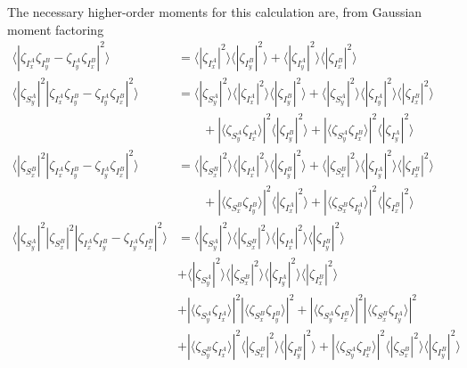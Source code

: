 \documentclass[aps,twocolumn,secnumarabic,amsmath,amssymb,pra,groupedaddress,
showpacs, showkeys]{revtex4-1}
\begin{document}
The necessary higher-order moments for this calculation are, from Gaussian moment factoring
\begin{align}
 \langle |\zeta_{I_x^A}\zeta_{I_y^B}-\zeta_{I_y^A}\zeta_{I_x^B}|^2 \rangle & = \langle |\zeta_{I_x^A}|^2 \rangle \langle |\zeta_{I_y^B}|^2 \rangle+\langle |\zeta_{I_y^A}|^2 \rangle \langle |\zeta_{I_x^B}|^2\rangle \nonumber \\
 \langle |\zeta_{S_y^A}|^2  |\zeta_{I_x^A}\zeta_{I_y^B}-\zeta_{I_y^A}\zeta_{I_x^B}|^2 \rangle & = \langle |\zeta_{S_y^A}|^2\rangle \langle |\zeta_{I_x^A}|^2\rangle \langle |\zeta_{I_y^B}|^2\rangle + \langle |\zeta_{S_y^A}|^2\rangle \langle |\zeta_{I_y^A}|^2\rangle \langle |\zeta_{I_x^B}|^2\rangle \nonumber \\
 & \qquad + |\langle \zeta_{S_y^A} \zeta_{I_x^A}\rangle|^2 \langle | \zeta_{I_y^B} |^2\rangle + |\langle \zeta_{S_y^A} \zeta_{I_x^B} \rangle|^2 \langle | \zeta_{I_y^A}  |^2\rangle \nonumber \\
 \langle |\zeta_{S_x^B}|^2 |\zeta_{I_x^A}\zeta_{I_y^B}-\zeta_{I_y^A}\zeta_{I_x^B}|^2 \rangle & = \langle |\zeta_{S_x^B}|^2\rangle \langle |\zeta_{I_x^A}|^2\rangle \langle |\zeta_{I_y^B}|^2\rangle + \langle |\zeta_{S_x^B}|^2\rangle \langle |\zeta_{I_y^A}|^2\rangle \langle |\zeta_{I_x^B}|^2\rangle \nonumber \\
  & \qquad + |\langle \zeta_{S_x^B} \zeta_{I_y^B}\rangle|^2 \langle | \zeta_{I_x^A} |^2\rangle + |\langle \zeta_{S_x^B} \zeta_{I_y^A} \rangle|^2 \langle | \zeta_{I_x^B}  |^2\rangle \nonumber \\
 \langle |\zeta_{S_y^A}|^2  |\zeta_{S_x^B}|^2 |\zeta_{I_x^A}\zeta_{I_y^B}-\zeta_{I_y^A}\zeta_{I_x^B}|^2 \rangle  & = \langle |\zeta_{S_y^A}|^2\rangle \langle |\zeta_{S_x^B}|^2\rangle \langle |\zeta_{I_x^A}|^2\rangle \langle |\zeta_{I_y^B}|^2\rangle \nonumber \\
 & + \langle |\zeta_{S_y^A}|^2\rangle \langle |\zeta_{S_x^B}|^2\rangle \langle |\zeta_{I_y^A}|^2\rangle \langle |\zeta_{I_x^B}|^2\rangle \nonumber \\
   &  + |\langle \zeta_{S_y^A} \zeta_{I_x^A}\rangle|^2 |\langle \zeta_{S_x^B} \zeta_{I_y^B}\rangle|^2+ |\langle \zeta_{S_y^A} \zeta_{I_x^B} \rangle|^2 |\langle \zeta_{S_x^B} \zeta_{I_y^A} \rangle|^2  \nonumber \\
   &  + |\langle \zeta_{S_y^B} \zeta_{I_x^A}\rangle|^2 \langle| \zeta_{S_x^B}|^2\rangle \langle|\zeta_{I_y^B}|^2\rangle + |\langle \zeta_{S_y^A} \zeta_{I_x^B}\rangle|^2 \langle| \zeta_{S_x^B}|^2\rangle \langle|\zeta_{I_y^B}|^2\rangle  \nonumber \\

\end{align}
\end{document}
